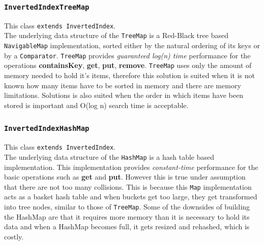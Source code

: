 \subsubsection{{\tt InvertedIndexTreeMap}}
This class {\tt extends InvertedIndex}.\\
The underlying data structure of the {\tt TreeMap} is a Red-Black tree based {\tt NavigableMap} implementation, sorted either by the natural ordering of its keys or by a {\tt Comparator}. {\tt TreeMap} provides \textit{guaranteed log(n) time} performance for the operations \textbf{containsKey}, \textbf{get}, \textbf{put}, \textbf{remove}.\cite{oracle:treemap} {\tt TreeMap} uses only the amount of memory needed to hold it's items, therefore this solution is suited when it is not known how many items have to be sorted in memory and there are memory limitations. Solutions is also suited when the order in which items have been stored is important and O(log n) search time is acceptable.\cite{baeldung:HashTreeCompared}

\subsubsection{{\tt InvertedIndexHashMap}}
This class {\tt extends InvertedIndex}.\\
The underlying data structure of the {\tt HashMap} is a hash table based implementation. This implementation provides \textit{constant-time} performance for the basic operations such as \textbf{get} and \textbf{put}.\cite{oracle:hashmap} However this is true under assumption that there are not too many collisions. This is because this {\tt Map} implementation acts as a basket hash table and when buckets get too large, they get transformed into tree nodes, similar to those of {\tt TreeMap}. \cite{baeldung:HashTreeCompared} Some of the downsides of building the HashMap are that it requires more memory than it is necessary to hold its data and when a HashMap becomes full, it gets resized and rehashed, which is costly.\cite{baeldung:HashTreeCompared}

